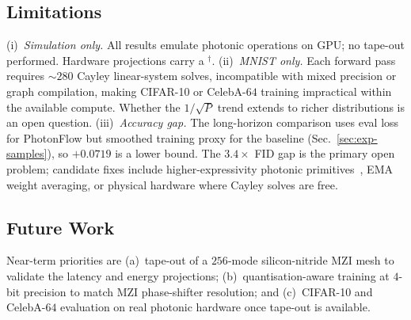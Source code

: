 \documentclass[conference]{IEEEtran}
\begin{document}
\subsection{Limitations}
\label{sec:limits}
(i)~\emph{Simulation only.}  All results emulate photonic
operations on GPU; no tape-out performed.  Hardware projections
carry a $^\dagger$.
(ii)~\emph{MNIST only.}  Each forward pass requires ${\sim}\!280$
Cayley linear-system solves, incompatible with mixed precision or
graph compilation, making CIFAR-10 or CelebA-$64$ training
impractical within the available compute.  Whether the $1/\sqrt{P}$
trend extends to richer distributions is an open question.
(iii)~\emph{Accuracy gap.}  The long-horizon comparison uses eval
loss for PhotonFlow but smoothed training proxy for the baseline
(Sec.~\ref{sec:exp-samples}), so $+0.0719$ is a lower bound.
The $3.4{\times}$ FID gap is the primary open problem; candidate
fixes include higher-expressivity photonic primitives~\cite{ning2024},
EMA weight averaging, or physical hardware where Cayley solves are free.

\subsection{Future Work}
\label{sec:future}
Near-term priorities are (a)~tape-out of a $256$-mode
silicon-nitride MZI mesh to validate the latency and energy
projections; (b)~quantisation-aware training at $4$-bit
precision to match MZI phase-shifter resolution; and
(c)~CIFAR-10 and CelebA-$64$ evaluation on real photonic
hardware once tape-out is available.

{\scriptsize

}
\end{document}
